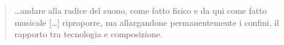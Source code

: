\documentclass{gs-adonis}
\begin{document}
\begin{quote}
  …andare alla radice del suono, come fatto fisico e da qui come fatto musicale […] riproporre, ma allargandone permanentemente i confini, il rapporto tra tecnologia e composizione.
\end{quote}










\end{document}
